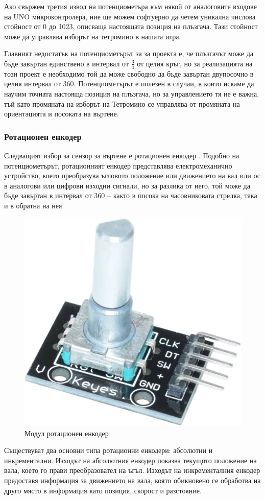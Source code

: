\documentclass[titlepage, oneside, 14pt]{extbook}
\begin{document}
Ако свържем третия извод на потенциометъра към някой от аналоговите входове на UNO микроконтролера,
ние ще можем софтуерно да четем уникална числова стойност от 0 до 1023, описваща настоящата позиция
на плъзгача. Тази стойност може да управлява изборът на тетромино в нашата игра.

Главният недостатък на потенциометърът за за проекта е, че плъзгачът може да бъде завъртан
единствено в интервал от $\frac{3}{4}$ от целия кръг, но за реализацията на този проект е необходимо
той да може свободно да бъде завъртан двупосочно в целия интервал от
360\textdegree{}. Потенциометърът е полезен в случаи, в които искаме да научим точната настояща позиция
на плъзгача, но за управлението тя не е важна, тъй като промяната на изборът на Тетромино се управлява
от промяната на ориентацията и посоката на въртене.

\subsubsection{Ротационен енкодер}

Следващият избор за сензор за въртене е ротационен енкодер \cite{encodertut}. Подобно на потенциометърът, ротационният енкодер представлява
електромеханично устройство, което преобразува ъгловото положение или движението на вал или ос
в аналогови или цифрови изходни сигнали, но за разлика от него, той може да
бъде завъртан в интервал от 360\textdegree{} -- както в посока на часовниковата
стрелка, така и в обратна на нея.

\begin{figure}[!htbp]
    \centering
    \includegraphics[width=0.5\linewidth]{img/encoder.png}
    \caption{Модул ротационен енкодер}
\end{figure}

Съществуват два основни типа ротационни енкодери: абсолютни и инкрементални. Изходът на абсолютния енкодер показва текущото
положение на вала, което го прави преобразовател на ъгъл. Изходът на
инкременталния енкодер предоставя информация за движението на вала, която
обикновено се обработва на друго място в информация като позиция, скорост и
разстояние.
\end{document}
